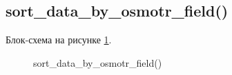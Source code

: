 \subsection{sort\_data\_by\_osmotr\_field()}

Блок-схема на рисунке \ref{fig:sort_data_by_osmotr_field}.

\begin{figure}[p]
    \caption{sort\_data\_by\_osmotr\_field()}
    \label{fig:sort_data_by_osmotr_field}
\end{figure}





\newpage